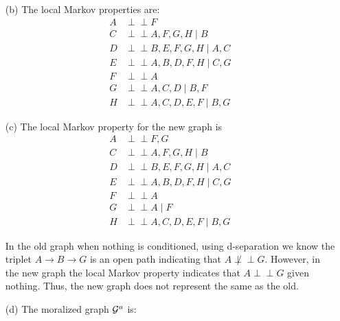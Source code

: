 \documentclass[11pt]{article}
\def\ci{\perp\!\!\!\perp}
\begin{document}
\begin{answertext}{18cm}{}
\begin{itemize}
\item[(b)] The local Markov properties are:
\begin{align*}
A &\ci F \\
C &\ci A, F, G, H \mid B \\
D &\ci B, E, F, G, H \mid A, C \\
E &\ci A, B, D, F, H \mid C, G \\
F &\ci A \\
G &\ci A, C, D \mid B, F \\
H &\ci A, C, D, E, F \mid B, G
\end{align*}

\item[(c)]
The local Markov property for the new graph is
\begin{align*}
A &\ci F, G \\
C &\ci A, F, G, H \mid B \\
D &\ci B, E, F, G, H \mid A, C \\
E &\ci A, B, D, F, H \mid C, G \\
F &\ci A \\
G &\ci A \mid F \\
H &\ci A, C, D, E, F \mid B, G
\end{align*}

In the old graph when nothing is conditioned, using d-separation we know the triplet $A \rightarrow B \rightarrow G$ is an open path indicating that $A \not\ci G$. However, in the new graph the local Markov property indicates that $A \ci G$ given nothing. Thus, the new graph does not represent the same as the old. \\

\item[(d)] The moralized graph ${\cal G}^a$ is:\\
\end{itemize}
\end{answertext}
\end{document}
